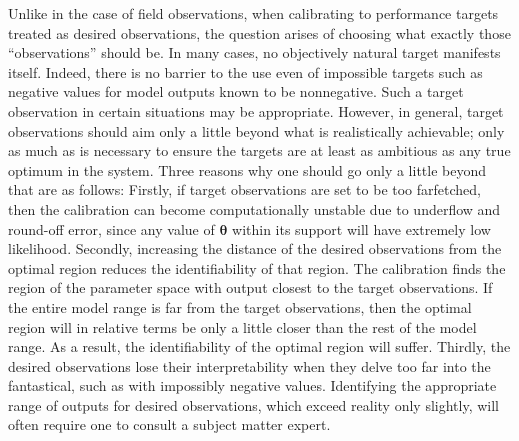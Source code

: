 \documentclass[12pt]{article}
\begin{document}
Unlike in the case of field observations, when calibrating to performance targets treated as desired observations, the question arises of choosing what exactly those ``observations'' should be.
%
In many cases, no objectively natural target manifests itself. 
%
Indeed, there is no barrier to the use even of impossible targets such as negative values for model outputs known to be nonnegative.
%
Such a target observation in certain situations may be appropriate. 
%
However, in general, target observations should aim only a little beyond what is realistically achievable; only as much as is necessary to ensure the targets are at least as ambitious as any true optimum in the system.
%
Three reasons why one should go only a little beyond that are as follows: 
%
Firstly, if target observations are set to be too farfetched, then the calibration can become computationally unstable due  to underflow and round-off error, since any value of $\boldsymbol \theta$ within its support will have extremely low likelihood.
%
Secondly, increasing the distance of the desired observations from the optimal region reduces the identifiability of that region.
%
The calibration finds the region of the parameter space with output closest to the target observations.
%
If the entire model range is far from the target observations, then the optimal region will in relative terms be only a little closer than the rest of the model range. 
% 
As a result, the identifiability of the optimal region will suffer.
%
%
Thirdly, the desired observations lose their interpretability when they delve too far into the fantastical, such as with impossibly negative values. 
%
Identifying the appropriate range of outputs for desired observations, which exceed reality only slightly, will often require one to consult a subject matter expert. 

\end{document}
